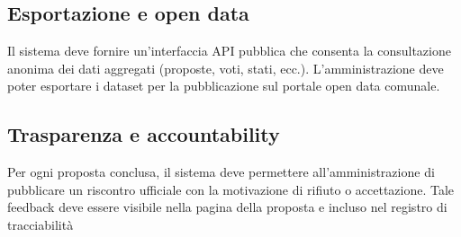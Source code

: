 \subsection{Esportazione e open data}
Il sistema deve fornire un’interfaccia API pubblica che consenta la consultazione anonima dei dati aggregati (proposte, voti, stati, ecc.).  
L’amministrazione deve poter esportare i dataset per la pubblicazione sul portale open data comunale.

\subsection{Trasparenza e accountability}
Per ogni proposta conclusa, il sistema deve permettere all’amministrazione di pubblicare un riscontro ufficiale con la motivazione di rifiuto o accettazione. Tale feedback deve essere visibile nella pagina della proposta e incluso nel registro di tracciabilità